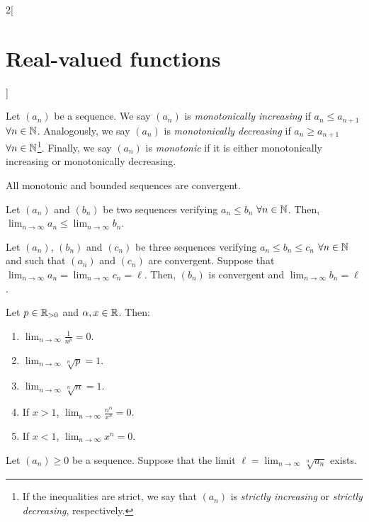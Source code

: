 \documentclass[../../../main_math.tex]{subfiles}
\begin{document}
\begin{multicols}{2}[\section{Real-valued functions}]
\begin{lemma}
\begin{enumerate}
    \end{enumerate}
  \end{lemma}
  \begin{definition}
    Let $(a_n)$ be a sequence. We say $(a_n)$ is \emph{monotonically increasing} if $a_n\leq a_{n+1}$ $\forall n\in\mathbb{N}$. Analogously, we say $(a_n)$ is \emph{monotonically decreasing} if $a_n\geq a_{n+1}$ $\forall n\in\mathbb{N}$\footnote{If the inequalities are strict, we say that $(a_n)$ is \emph{strictly increasing} or \emph{strictly decreasing}, respectively.}. Finally, we say $(a_n)$ is \emph{monotonic} if it is either monotonically increasing or monotonically decreasing.
  \end{definition}
  \begin{theorem}
    All monotonic and bounded sequences are convergent.
  \end{theorem}
  \begin{lemma}
    Let $(a_n)$ and $(b_n)$ be two sequences verifying $a_n\leq b_n$ $\forall n\in\mathbb{N}$. Then, $\displaystyle\lim_{n\to\infty} a_n\leq\lim_{n\to\infty} b_n$.
  \end{lemma}
  \begin{proposition}
    Let $(a_n)$, $(b_n)$ and $(c_n)$ be three sequences verifying $a_n\leq b_n\leq c_n$ $\forall n\in\mathbb{N}$ and such that $(a_n)$ and $(c_n)$ are convergent. Suppose that $\displaystyle\lim_{n\to\infty} a_n=\lim_{n\to\infty} c_n=\ell$. Then, $(b_n)$ is convergent and $\displaystyle\lim_{n\to\infty} b_n=\ell$.
  \end{proposition}
  \begin{lemma}
    Let $p\in\mathbb{R}_{>0}$ and $\alpha,x\in\mathbb{R}$. Then:
    \begin{enumerate}
      \item $\displaystyle\lim_{n\to\infty}\frac{1}{n^p}=0$.
      \item $\displaystyle\lim_{n\to\infty}\sqrt[n]{p}=1$.
      \item $\displaystyle\lim_{n\to\infty}\sqrt[n]{n}=1$.
      \item If $x>1$, $\displaystyle\lim_{n\to\infty}\frac{n^\alpha}{x^n}=0$.
      \item If $x<1$, $\displaystyle\lim_{n\to\infty} x^n=0$.
    \end{enumerate}
  \end{lemma}
  \begin{theorem}
    Let $(a_n)\geq 0$ be a sequence. Suppose that the limit $\displaystyle \ell=\lim_{n\to\infty}\sqrt[n]{a_n}$ exists.
    \begin{enumerate}

\end{enumerate}
\end{theorem}
\end{multicols}
\end{document}
